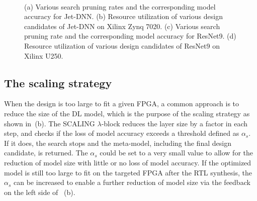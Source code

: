 




\begin{figure} 
   \centering
   \hspace*{\fill}
  \\
   \hspace*{\fill}
    
  \caption{(a) Various search pruning rates and the corresponding model accuracy for Jet-DNN. (b) Resource utilization of various design candidates of Jet-DNN on Xilinx Zynq 7020. (c) Various search pruning rate and the corresponding model accuracy for ResNet9. (d) Resource utilization of various design candidates of ResNet9 on Xilinx U250.  }
  \label{fig:auto_pruning_results} 
\end{figure}


\subsection{The scaling strategy}\label{sec:scaling}
When the design is too large to fit a given FPGA, a common approach is to reduce the size of the DL model, which is the purpose of the scaling strategy as shown in~(b). 
The SCALING $\lambda$-block reduces the layer size by a factor in each step, and checks if the loss of model accuracy exceeds a threshold defined as $\alpha_s$. If it does, the search stops and the meta-model, including the final design candidate, is returned. 
The $\alpha_s$ could be set to a very small value to allow for the reduction of model size with little or no loss of model accuracy. If the optimized model is still too large to fit on the targeted FPGA after the RTL synthesis, the $\alpha_s$ can be increased to enable a further reduction of model size via the feedback on the left side of ~(b). 

